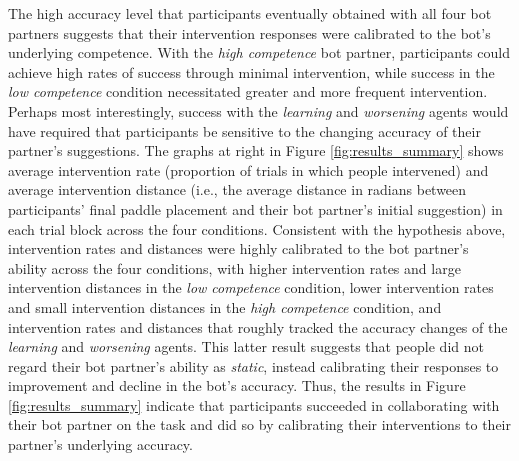 \documentclass[10pt,letterpaper]{article}
\begin{document}


The high accuracy level that participants eventually obtained with all four bot partners suggests that their intervention responses were calibrated to the bot's underlying competence. With the \textit{high competence} bot partner, participants could achieve high rates of success through minimal intervention, while success in the \textit{low competence} condition necessitated greater and more frequent intervention. Perhaps most interestingly, success with the \textit{learning} and \textit{worsening} agents would have required that participants be sensitive to the changing accuracy of their partner's suggestions. The graphs at right in Figure \ref{fig:results_summary} shows average intervention rate (proportion of trials in which people intervened) and average intervention distance (i.e., the average distance in radians between participants' final paddle placement and their bot partner's initial suggestion) in each trial block across the four conditions. Consistent with the hypothesis above, intervention rates and distances were highly calibrated to the bot partner's ability across the four conditions, with higher intervention rates and large intervention distances in the \textit{low competence} condition, lower intervention rates and small intervention distances in the \textit{high competence} condition, and intervention rates and distances that roughly tracked the accuracy changes of the \textit{learning} and \textit{worsening} agents. This latter result suggests that people did not regard their bot partner's ability as \textit{static}, instead calibrating their responses to improvement and decline in the bot's accuracy. Thus, the results in Figure \ref{fig:results_summary} indicate that participants succeeded in collaborating with their bot partner on the task and did so by calibrating their interventions to their partner's underlying accuracy.
 
\end{document}
